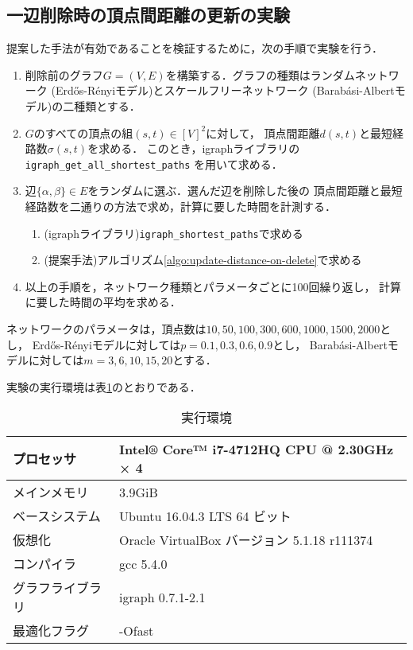 \subsection*{一辺削除時の頂点間距離の更新の実験}
提案した手法が有効であることを検証するために，次の手順で実験を行う．
\begin{enumerate}
\item 削除前のグラフ$G=(V,E)$を構築する．グラフの種類はランダムネットワーク
  (Erd\H{o}s-R{\'e}nyiモデル\cite{Erdos1959})とスケールフリーネットワーク
  (Barab{\'a}si-Albertモデル\cite{Barabasi1999})の二種類とする．
\item $G$のすべての頂点の組$(s,t)\in[V]^2$に対して，
  頂点間距離$d(s,t)$と最短経路数$\sigma(s,t)$を求める．
  このとき，igraphライブラリの\verb|igraph_get_all_shortest_paths|
  を用いて求める．
\item 辺$\{\alpha,\beta\}\in E$をランダムに選ぶ．選んだ辺を削除した後の
  頂点間距離と最短経路数を二通りの方法で求め，計算に要した時間を計測する．
  \begin{enumerate}[a]
  \item (igraphライブラリ)\verb|igraph_shortest_paths|で求める
  \item (提案手法)アルゴリズム\ref{algo:update-distance-on-delete}で求める
  \end{enumerate}
\item 以上の手順を，ネットワーク種類とパラメータごとに100回繰り返し，
  計算に要した時間の平均を求める．
\end{enumerate}
ネットワークのパラメータは，頂点数は$10,50,100,300,600,1000,1500,2000$とし，
Erd\H{o}s-R{\'e}nyiモデルに対しては$p=0.1,0.3,0.6,0.9$とし，
Barab{\'a}si-Albertモデルに対しては$m=3,6,10,15,20$とする．

実験の実行環境は表\ref{tab:env-mws}のとおりである．
\begin{table}
  \caption{実行環境}
  \label{tab:env-mws}
  \centering
  \begin{tabular}{ll}
    \hline
    プロセッサ & Intel® Core™ i7-4712HQ CPU @ 2.30GHz × 4 \\ \hline
    メインメモリ & 3.9GiB \\ \hline
    ベースシステム & Ubuntu 16.04.3 LTS 64 ビット \\ \hline
    仮想化 & Oracle VirtualBox バージョン 5.1.18 r111374 \\ \hline
    コンパイラ & gcc 5.4.0 \\ \hline
    グラフライブラリ & igraph 0.7.1-2.1 \\ \hline
    最適化フラグ & -Ofast \\ \hline
  \end{tabular}
\end{table}

